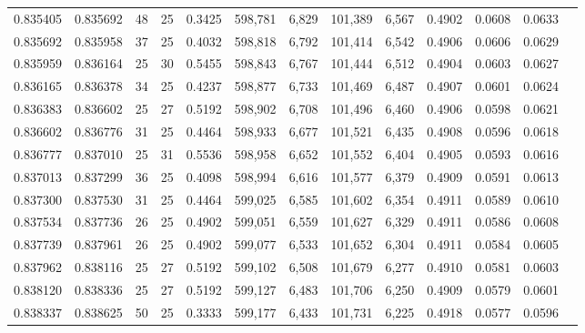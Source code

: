 \begin{tabular}{rrrrrrrrrrrrr}
0.835405 & 0.835692 &    48 &  25 &                                     0.3425 & 598,781 &   6,829 & 101,389 &   6,567 & 0.4902 & 0.0608 & 0.0633 \\
0.835692 & 0.835958 &    37 &  25 &                                     0.4032 & 598,818 &   6,792 & 101,414 &   6,542 & 0.4906 & 0.0606 & 0.0629 \\
0.835959 & 0.836164 &    25 &  30 &                                     0.5455 & 598,843 &   6,767 & 101,444 &   6,512 & 0.4904 & 0.0603 & 0.0627 \\
0.836165 & 0.836378 &    34 &  25 &                                     0.4237 & 598,877 &   6,733 & 101,469 &   6,487 & 0.4907 & 0.0601 & 0.0624 \\
0.836383 & 0.836602 &    25 &  27 &                                     0.5192 & 598,902 &   6,708 & 101,496 &   6,460 & 0.4906 & 0.0598 & 0.0621 \\
0.836602 & 0.836776 &    31 &  25 &                                     0.4464 & 598,933 &   6,677 & 101,521 &   6,435 & 0.4908 & 0.0596 & 0.0618 \\
0.836777 & 0.837010 &    25 &  31 &                                     0.5536 & 598,958 &   6,652 & 101,552 &   6,404 & 0.4905 & 0.0593 & 0.0616 \\
0.837013 & 0.837299 &    36 &  25 &                                     0.4098 & 598,994 &   6,616 & 101,577 &   6,379 & 0.4909 & 0.0591 & 0.0613 \\
0.837300 & 0.837530 &    31 &  25 &                                     0.4464 & 599,025 &   6,585 & 101,602 &   6,354 & 0.4911 & 0.0589 & 0.0610 \\
0.837534 & 0.837736 &    26 &  25 &                                     0.4902 & 599,051 &   6,559 & 101,627 &   6,329 & 0.4911 & 0.0586 & 0.0608 \\
0.837739 & 0.837961 &    26 &  25 &                                     0.4902 & 599,077 &   6,533 & 101,652 &   6,304 & 0.4911 & 0.0584 & 0.0605 \\
0.837962 & 0.838116 &    25 &  27 &                                     0.5192 & 599,102 &   6,508 & 101,679 &   6,277 & 0.4910 & 0.0581 & 0.0603 \\
0.838120 & 0.838336 &    25 &  27 &                                     0.5192 & 599,127 &   6,483 & 101,706 &   6,250 & 0.4909 & 0.0579 & 0.0601 \\
0.838337 & 0.838625 &    50 &  25 &                                     0.3333 & 599,177 &   6,433 & 101,731 &   6,225 & 0.4918 & 0.0577 & 0.0596 \\

\end{tabular}
